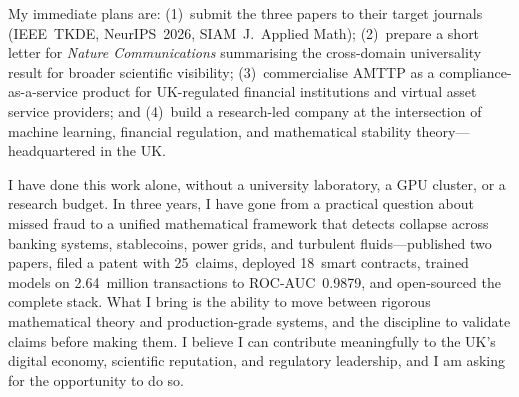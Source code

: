 \documentclass[12pt,a4paper]{article}
\begin{document}
My immediate plans are: (1)~submit the three papers to their target
journals (IEEE~TKDE, NeurIPS~2026, SIAM~J.~Applied Math);
(2)~prepare a short letter for \textit{Nature Communications}
summarising the cross-domain universality result for broader scientific
visibility; (3)~commercialise AMTTP as a compliance-as-a-service product
for UK-regulated financial institutions and virtual asset service
providers; and (4)~build a research-led company at the intersection of
machine learning, financial regulation, and mathematical stability
theory---headquartered in the UK.


\medskip

I have done this work alone, without a university laboratory, a GPU
cluster, or a research budget.  In three years, I have gone from a
practical question about missed fraud to a unified mathematical framework
that detects collapse across banking systems, stablecoins, power grids,
and turbulent fluids---published two papers, filed a patent with
25~claims, deployed 18~smart contracts, trained models on 2.64~million
transactions to ROC-AUC~0.9879, and open-sourced the complete stack.
What I bring is the ability to move between rigorous mathematical theory
and production-grade systems, and the discipline to validate claims
before making them.  I believe I can contribute meaningfully to the UK's
digital economy, scientific reputation, and regulatory leadership, and
I am asking for the opportunity to do so.
\end{document}
